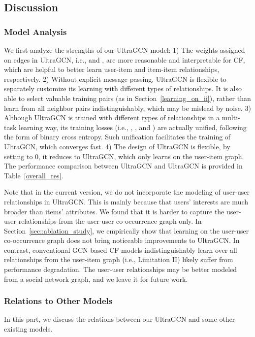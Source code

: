 \documentclass[sigconf,authorversion]{acmart}
\begin{document}
\subsection{Discussion}
\label{model_strength}
\subsubsection{Model Analysis}
We first analyze the strengths of our UltraGCN model: 1) The weights assigned on edges in UltraGCN, i.e.,  and , are more reasonable and interpretable for CF, which are helpful to better learn user-item and item-item relationships, respectively. 
2) Without explicit message passing, UltraGCN is flexible to separately customize its learning with different types of relationships. It is also able to select valuable training pairs (as in Section~\ref{learning_on_ii}), rather than learn from all neighbor pairs indistinguishably, which may be mislead by noise. 3) Although UltraGCN is trained with different types of relationships in a multi-task learning way, its training losses (i.e., , , and ) are actually unified, following the form of binary cross entropy. Such unification facilitates the training of UltraGCN, which converges fast. 4) The design of UltraGCN is flexible, by setting  to 0, it reduces to UltraGCN, which only learns on the user-item graph. The performance comparison between UltraGCN and UltraGCN is provided in Table~\ref{overall_res}.



Note that in the current version, we do not incorporate the modeling of user-user relationships in UltraGCN. This is mainly because that users' interests are much broader than items' attributes. We found that it is harder to capture the user-user relationships from the user-user co-occurrence graph only. In Section~\ref{sec::ablation_study}, we empirically show that learning on the user-user co-occurrence graph does not bring noticeable improvements to UltraGCN. In contrast, conventional GCN-based CF models indistinguishably learn over all relationships from the user-item graph (i.e., Limitation II) likely suffer from performance degradation. The user-user relationships may be better modeled from 
a social network graph, and we leave it for future work. 






\subsubsection{Relations to Other Models}
\label{sec::relations_to_other_models}
In this part, we discuss the relations between our UltraGCN and some other existing models.
\end{document}
